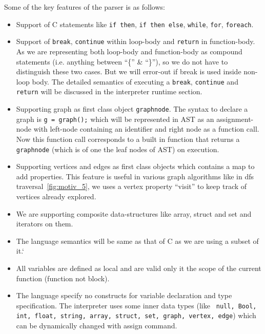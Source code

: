     Some of the key features of the parser is as follows:
    \begin{itemize}
      \item Support of C statements like  {\tt if then}, {\tt if then 
        else}, {\tt while}, {\tt for}, {\tt foreach}. 

      \item Support of {\tt break}, {\tt continue} within loop-body 
      and {\tt return} in function-body.
      As we are representing both loop-body and function-body as compound 
      statements (i.e. anything between ``\{'' \& ``\}''), so we do not have to
      distinguish these two cases. But we will error-out if break is used inside 
      non-loop body. The detailed semantics of executing a {\tt break},   
{\tt continue} and {\tt return} will be discussed in the interpreter 
runtime section.

      \item Supporting graph as first class object {\tt graphnode}.
      The syntax to declare a graph is {\tt g = graph();} which will be 
      represented in AST as an assignment-node with left-node containing an 
      identifier and right
      node as a function call. Now this function call corresponds to a built in 
      function that returns a {\tt graphnode} (which is of one the leaf 
          nodes of AST) on execution.

      \item Supporting vertices and edges as first class objects which contains 
      a map to add properties. This feature is useful in various graph 
      algorithms like in dfs traversal~\ref{fig:motiv_5}, we uses a vertex property ``visit'' 
      to keep track of vertices already explored.

      \item We are supporting composite data-structures like array, struct and 
      set and iterators on them. 

      \item The language semantics will be same as that of C as we are using a subset of it.`

      \item All variables are defined as local and are valid only it the scope of the current function (function not block).

      \item The language specify no constructs for variable declaration and type 
      specification. The interpreter uses some inner data types (like {\tt 
          null, Bool, int, float, string, array, struct, set, graph, vertex, 
          edge})  which can be dynamically changed with assign command.

    \end{itemize}
%    
  

